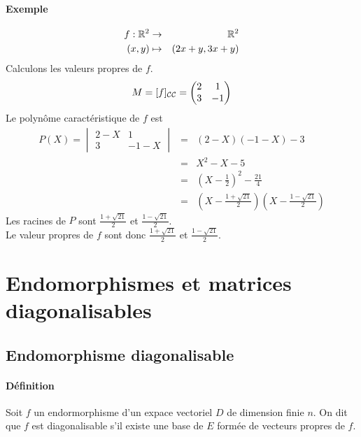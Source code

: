 \paragraph{Exemple} 
\begin{eqnarray*}
  f: \mathbb{R}^2 &\rightarrow& \mathbb{R}^2 \\
  (x, y) &\mapsto& (2x + y, 3x+ y)
\end{eqnarray*}
Calculons les valeurs propres de $f$.
\begin{eqnarray*}
  M = [f]_{\mathcal{C} \mathcal{C}} = \begin{pmatrix} 2 & 1 \\ 3 & -1 \end{pmatrix}
\end{eqnarray*}
Le polynôme caractéristique de $f$ est
\begin{eqnarray*}
  P(X) = \begin{vmatrix} 2-X & 1 \\ 3 & -1-X \end{vmatrix} &=& (2 -X)(-1 -X) -3 \\
    &=& X^2 - X - 5 \\
    &=& \left( X-\frac{1}{2} \right)^2 - \frac{21}{4} \\
    &=& \left(X - \frac{1 + \sqrt{21}}{2} \right) \left(X - \frac{1 - \sqrt{21}}{2} \right)
\end{eqnarray*}
Les racines de $P$ sont $\frac{1 + \sqrt{21}}{2}$ et $\frac{1 - \sqrt{21}}{2}$. \\
Le valeur propres de $f$ sont donc $\frac{1 + \sqrt{21}}{2}$ et $\frac{1 - \sqrt{21}}{2}$.

%
%
\section{Endomorphismes et matrices diagonalisables}
%
%

%
\subsection{Endomorphisme diagonalisable}
%
\paragraph{Définition} Soit $f$ un endormorphisme d'un expace vectoriel $D$ de dimension finie $n$. On dit que $f$ est diagonalisable s'il existe une base de $E$ formée de vecteurs propres de $f$.

